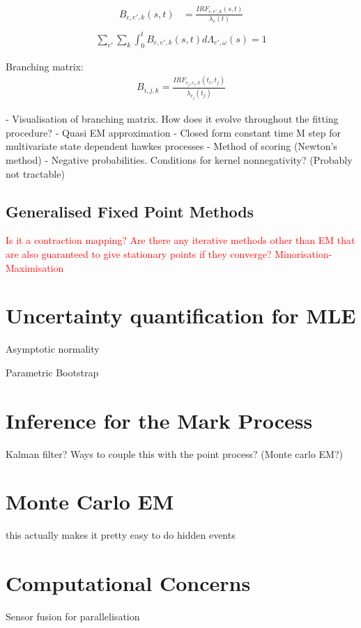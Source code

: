 \documentclass[honours,12pt]{unswthesis}
\numberwithin{equation}{section}
\begin{document}
\begin{align*}
	B_{e,e',k}(s,t)
	&= \frac{IRF_{e,e',k}(s,t)}{\lambda_{e}(t)} \\
\end{align*}
\begin{align*}
	\sum_{e'} \sum_{k} \int_0^t B_{e,e',k}(s,t)d\Lambda_{e',\omega}(s) = 1
\end{align*}

Branching matrix:
\begin{align*}
	B_{i,j,k} = \frac{IRF_{e_j,e_i,k}(t_i,t_j)}{\lambda_{e_j}(t_j)}
\end{align*}

- Visualisation of branching matrix. How does it evolve throughout the fitting procedure?
- Quasi EM approximation
- Closed form constant time M step for multivariate state dependent hawkes processes
- Method of scoring (Newton's method)
- Negative probabilities. Conditions for kernel nonnegativity? (Probably not tractable)

\subsection{Generalised Fixed Point Methods}
\textcolor{red}{Is it a contraction mapping?}
\textcolor{red}{Are there any iterative methods other than EM that are also guaranteed to give stationary points if they converge?}
\textcolor{red}{Minorisation-Maximisation}

\section{Uncertainty quantification for MLE}
Asymptotic normality

Parametric Bootstrap

\section{Inference for the Mark Process}
Kalman filter? Ways to couple this with the point process? (Monte carlo EM?)

\section{Monte Carlo EM}
this actually makes it pretty easy to do hidden events

\section{Computational Concerns}
Sensor fusion for parallelisation
\end{document}
